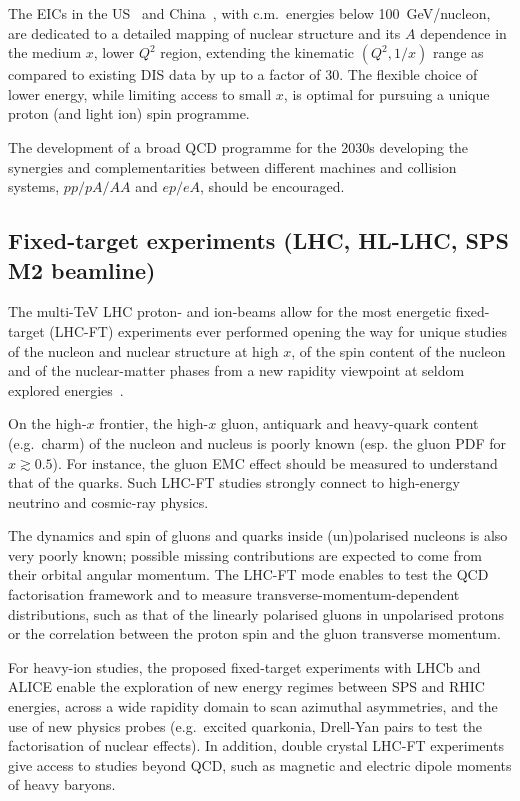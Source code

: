 The EICs in the US~\cite{Accardi:2012qut} and China~\cite{Chen:2018wyz}, with
c.m.\ energies below 100~GeV/nucleon, are dedicated to a detailed mapping of
nuclear structure and its $A$ dependence in the medium $x$, lower $Q^2$ region,
extending the kinematic $(Q^2, 1/x)$ range as compared to existing DIS data by
up to a factor of 30. The flexible choice of lower energy, while limiting
access to small $x$, is optimal for pursuing a unique proton (and light ion)
spin programme.

The development of a broad QCD programme for the 2030s developing the synergies
and complementarities between different machines and collision systems,
$pp/pA/AA$ and $ep/eA$, should be encouraged.


\subsection{Fixed-target experiments (LHC, HL-LHC, SPS M2 beamline)}

The multi-TeV LHC proton- and ion-beams allow for the most energetic
fixed-target (LHC-FT) experiments ever performed opening the way for unique
studies of the nucleon and nuclear structure at high $x$, of the spin content
of the nucleon and of the nuclear-matter phases from a new rapidity viewpoint
at seldom explored energies~\cite{Brodsky:2012vg,Hadjidakis:2018ifr}.

On the high-$x$ frontier, the high-$x$ gluon, antiquark and heavy-quark content
(e.g.\ charm) of the nucleon and nucleus is poorly known (esp. the gluon PDF for
$x \gtrsim 0.5$). For instance, the gluon EMC effect should be measured to
understand that of the quarks. Such LHC-FT studies strongly connect to
high-energy neutrino and cosmic-ray physics.

The dynamics and spin of gluons and quarks inside (un)polarised nucleons is
also very poorly known; possible missing contributions are expected to come
from their orbital angular momentum. The LHC-FT mode enables to test the QCD
factorisation framework and to measure transverse-momentum-dependent
distributions, such as that of the linearly polarised gluons in unpolarised
protons or the correlation between the proton spin and the gluon transverse
momentum.

For heavy-ion studies, the proposed fixed-target experiments with LHCb and
ALICE enable the exploration of new energy regimes between SPS and RHIC
energies, across a wide rapidity domain to scan azimuthal asymmetries, and the
use of new physics probes (e.g.\ excited quarkonia, Drell-Yan pairs to test the
factorisation of nuclear effects).
%
In addition, double crystal LHC-FT experiments give access to studies beyond
QCD, such as magnetic and electric dipole moments of heavy baryons.
 
